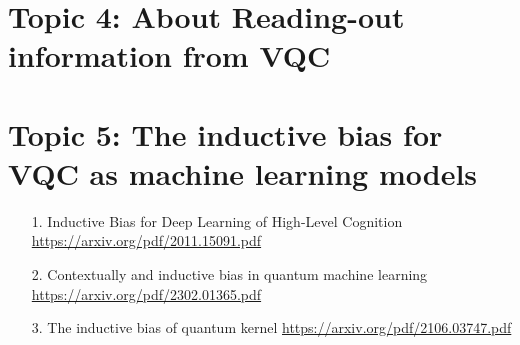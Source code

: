 \documentclass[12pt, oneside]{article}   	%
\begin{document}
\section{Topic 4: About Reading-out information  from VQC}

\section{Topic 5: The inductive bias for VQC as machine learning models}
\begin{itemize}
\item[1. ] Inductive Bias for Deep Learning of High-Level Cognition \url{https://arxiv.org/pdf/2011.15091.pdf}
\item[2. ] Contextually and inductive bias in quantum machine learning \url{https://arxiv.org/pdf/2302.01365.pdf}
\item[3. ] The inductive bias of quantum kernel \url{https://arxiv.org/pdf/2106.03747.pdf}
\end{itemize}
\end{document}
